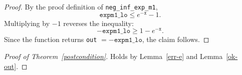 \documentclass{article}
\begin{document}
\begin{proof}
By the proof definition of \texttt{neg\_inf\_exp\_m1},
\[
\texttt{expm1\_lo} \le e^{-\texttt{x}} - 1.
\]
Multiplying by $-1$ reverses the inequality:
\[
-\texttt{expm1\_lo} \ge 1 - e^{-\texttt{x}}.
\]
Since the function returns \texttt{out} $= -\texttt{expm1\_lo}$, the claim follows.
\end{proof}

\begin{proof}[Proof of Theorem~\ref{postcondition}]
Holds by Lemma~\ref{err-e} and Lemma~\ref{ok-out}.
\end{proof}
\end{document}
